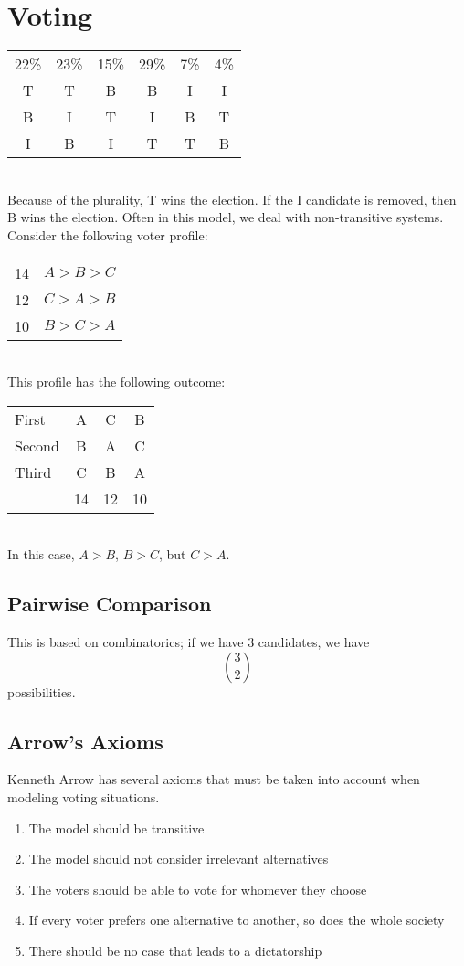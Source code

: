 \documentclass{hw}
\begin{document}
\section{Voting}
{\centering
\begin{tabular}{c c c c c c}
22\% & 23\% & 15\% & 29\% & 7\% & 4\%\\
T&T&B&B&I&I\\
B&I&T&I&B&T\\
I&B&I&T&T&B
\end{tabular}
}
\noindent\\
Because of the plurality, T wins the election. If the I candidate is removed, then B wins the election.
Often in this model, we deal with non-transitive systems. Consider the following voter profile:\\
{\centering
\begin{tabular}{c c}
14 & $A>B>C$\\
12 & $C>A>B$\\
10 & $B>C>A$
\end{tabular}
}
\noindent\\
This profile has the following outcome:\\
{\centering
\begin{tabular}{l c c c}
First & A&C&B\\
Second & B&A&C\\
Third & C&B&A\\
& 14&12&10
\end{tabular}
}
\noindent\\
In this case, $A>B$, $B>C$, but $C>A$.

\subsection{Pairwise Comparison}
This is based on combinatorics; if we have 3 candidates, we have
\[
{3 \choose 2}
\]
possibilities.

\subsection{Arrow's Axioms}

Kenneth Arrow has several axioms that must be taken into account when modeling voting situations.
\begin{enumerate}
\item The model should be transitive
\item The model should not consider irrelevant alternatives
\item The voters should be able to vote for whomever they choose
\item If every voter prefers one alternative to another, so does the whole society
\item There should be no case that leads to a dictatorship
\end{enumerate}
\end{document}
